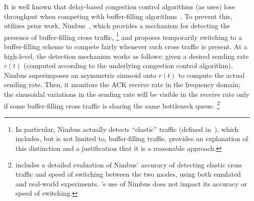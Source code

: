 It is well known that delay-based congestion control algorithms (as \name uses) lose throughput when competing with buffer-filling algorithms~\cite{copa}. 
To prevent this, \name utilizes prior work, Nimbus~\cite{nimbus-arxiv}, which provides a mechanism for detecting the presence of buffer-filling cross traffic,
\footnote{In particular, Nimbus actually detects ``elastic'' traffic (defined in~\cite{nimbus-arxiv}), which includes, but is not limited to, buffer-filling traffic. \cite{nimbus-arxiv} provides an explanation of this distinction and a justification that it is a reasonable approach.}
and proposes temporarily switching to a buffer-filling scheme to compete fairly whenever such cross traffic is present.
At a high-level, the detection mechanism works as follows: given a desired sending rate $r(t)$ (computed according to the underlying congestion control algorithm), Nimbus superimposes an asymmetric sinusoid onto $r(t)$ to compute the actual sending rate. Then, it monitors the ACK receive rate in the frequency domain; the sinusoidal variations in the sending rate will be visible in the receive rate only if some buffer-filling cross traffic is sharing the same bottleneck queue. %
\footnote{\cite{nimbus-arxiv} includes a detailed evaluation of Nimbus' accuracy of detecting elastic cross traffic and speed of switching between the two modes, using both emulated and real-world experiments. \name{}'s use of Nimbus does not impact its accuracy or speed of switching.}

